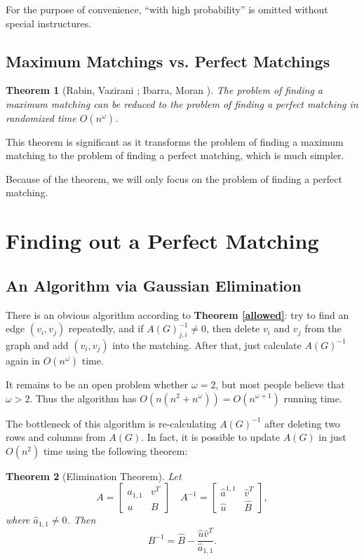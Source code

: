 \documentclass[a4paper]{article}
\newtheorem{theorem}{\hspace{2em}Theorem}
\begin{document}
			For the purpose of convenience, ``with high probability'' is omitted without special instructures.

		\subsection{Maximum Matchings vs. Perfect Matchings}
			
			\begin{theorem}[Rabin, Vazirani \cite{rabin} ; Ibarra, Moran \cite{ibarra}]
				The problem of finding a maximum matching can be reduced to the problem of finding a perfect matching in randomized time $O(n^\omega)$.
				\label{maximum}
			\end{theorem}

			This theorem is significant as it transforms the problem of finding a maximum matching to the problem of finding a perfect matching, which is much simpler.

			Because of the theorem, we will only focus on the problem of finding a perfect matching.

	\section{Finding out a Perfect Matching}
		\subsection{An Algorithm via Gaussian Elimination}

			\hspace{2em}There is an obvious algorithm according to {\bfseries Theorem \ref{allowed}}: try to find an edge $(v_i, v_j)$ repeatedly, and if $A(G)^{-1}_{j, i} \ne 0$, then delete $v_i$ and $v_j$ from the graph and add $(v_i, v_j)$ into the matching. After that, just calculate $A(G)^{-1}$ again in $O(n^\omega)$ time.

			It remains to be an open problem whether $\omega = 2$, but most people believe that $\omega > 2$. Thus the algorithm has $O(n (n^2 + n^\omega)) = O(n^{\omega + 1})$ running time.
			
			The bottleneck of this algorithm is re-calculating $A(G)^{-1}$ after deleting two rows and columns from $A(G)$. In fact, it is possible to update $A(G)$ in just $O(n^2)$ time using the following theorem:

			\begin{theorem} [Elimination Theorem]
				Let
				$$ A = \begin{bmatrix}
					a_{1, 1} & v^T \\
					u & B
				\end{bmatrix} \quad A^{-1} = \begin{bmatrix}
					\hat a^{1, 1} & \hat v^T \\
					\hat u & \hat B
				\end{bmatrix} , $$
				where $\hat a_{1, 1} \ne 0$. Then
				$$ B^{-1} = \hat B - \frac {\hat u \hat v^T} {\hat a_{1, 1}}. $$
				\label{elimination}
			\end{theorem}
\end{document}
